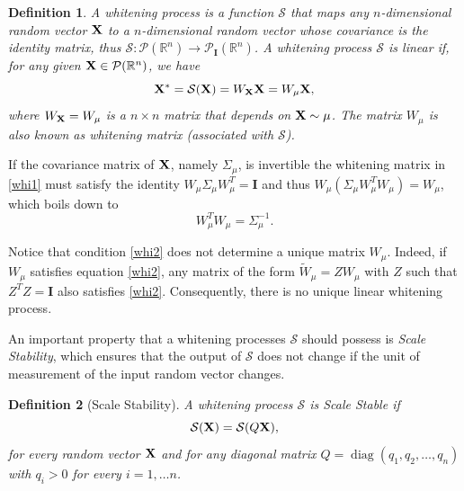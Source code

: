 \documentclass{article}
\renewcommand{\to}{\rightarrow}
\def \Id{\mathbf{I}}
\def\bX{{\bf X}}
\DeclareMathOperator{\diag}{diag}
\def \erre{\mathbb{R}}
\newtheorem{definition}{Definition}
\begin{document}
\begin{definition}
    A \textit{whitening process} is a function $\mathcal{S}$ that maps any $n$-dimensional random vector $\bX$ to a $n$-dimensional random vector whose covariance is the identity matrix, thus $\mathcal{S}:\mathcal{P}(\erre^n)\to\mathcal{P}_{\Id}(\erre^n)$. 
    A whitening process $\mathcal{S}$ is linear if, for any given $\bX\in\mathcal{P}(\erre^n)$, we have
    \begin{equation}
        \label{whi1}
        {\bX}^{*} = \mathcal{S}(\bX) = W_{\bX}{\bX} = W_{\mu}{\bX},
    \end{equation}
    where $W_\bX=W_\mu$ is a $n\times n$ matrix that depends on $\bX\sim\mu$.
    The matrix $W_\mu$ is also known as whitening matrix (associated with $\mathcal{S}$).\cite{KLS}
\end{definition}

% 

% 
If the covariance matrix of $\bX$, namely $\Sigma_\mu$, is invertible the whitening matrix in \eqref{whi1} must satisfy the identity $W_\mu\Sigma_\mu W_\mu^T = \Id$ and thus $W_\mu (\Sigma_\mu W_\mu^TW_\mu) = W_\mu$, which boils down to
% 
\begin{equation}
    \label{whi2}
    W_\mu^TW_\mu =\Sigma_\mu^{-1}.
\end{equation}

% 
Notice that condition \eqref{whi2} does not determine a unique matrix $W_\mu$.
% 
Indeed, if $W_\mu$ satisfies equation \eqref{whi2}, any matrix of the form $\widetilde W_\mu = Z W_\mu$ with $Z$ such that $Z^TZ=\Id$ also satisfies \eqref{whi2}.
% 
Consequently, there is no unique linear whitening process.\cite{LZ}
% 

An important property that a whitening processes $\mathcal{S}$ should possess is \emph{Scale Stability}, which ensures that the output of $\mathcal{S}$ does not change if the unit of measurement of the input random vector changes.
% 


\begin{definition}[Scale Stability]
    A whitening process $\mathcal{S}$ is \emph{Scale Stable} if
    \begin{equation}
        \label{eq:scale_stab}
        \mathcal{S}({\bX})=\mathcal{S}(Q{\bX}),
    \end{equation}
    for every random vector $\bX$ and for any diagonal matrix $Q=\diag(q_1,q_2,\dots,q_n)$
    with $q_i>0$ for every $i=1,\dots n$.
\end{definition}
\end{document}
